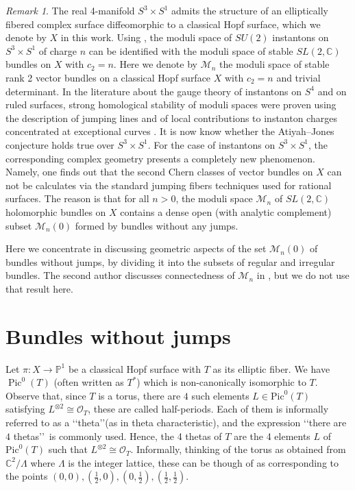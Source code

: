 \documentclass[
  a4paper, 
  reqno, 
  oneside, 
  11pt
]{amsart}
\theoremstyle{plain}	%
\theoremstyle{mydef} %
\theoremstyle{remark}
\newtheorem{remark}{Remark}
\theoremstyle{definition}
\theoremstyle{remark}
\DeclareMathOperator{\Pic}{Pic}
\begin{document}
\begin{remark}
The real 4-manifold $S^3 \times S^1$ admits the structure of an elliptically fibered
 complex surface diffeomorphic to  a classical Hopf surface, 
which we denote by $X$ in this work. 
Using \cite[Thm.]{Bu}, the moduli space of $SU(2)$ instantons on $S^3 \times S^1$
of charge $n$ can be identified with the moduli space of stable $SL(2,\mathbb C)$ bundles on $X$ with $c_2=n$.
 Here we denote by $\mathcal M_n$  the moduli space of  stable rank 2 vector bundles on 
 a classical Hopf surface $X$
 with $c_2=n$ and trivial determinant. 
  In the literature about the gauge theory of instantons on $S^4$ and  on ruled surfaces, 
  strong homological stability 
  of moduli spaces were proven using the description of jumping lines \cite{BHMM, HM}
  and of local contributions to instanton charges concentrated at exceptional curves \cite{Ga}.
It is now know
  whether the Atiyah--Jones conjecture \cite{AJ} holds true over $S^3\times S^1$.
  For the case of instantons on $S^3\times S^1$, the corresponding complex geometry
  presents a  completely new phenomenon.
 Namely, one  finds out that 
  the second Chern classes of vector bundles on $X$ can not be calculates via  the standard
  { jumping fibers} techniques used for rational surfaces. The reason is that 
   for all $n>0$, the moduli space $\mathcal M_n$ 
  of $SL(2,\mathbb C)$  holomorphic bundles 
  on $X$ contains a dense open (with analytic complement) subset $\mathcal M_n(0)$  formed by bundles without any jumps.
  \end{remark}
 
  Here we concentrate in discussing geometric aspects of the 
   set $\mathcal M_n(0)$ of bundles without jumps, by dividing it into the subsets of regular 
   and irregular bundles.  
  The second author discusses connectedness of 
  $\mathcal M_n$ in \cite{Ga2}, but we do not use that result here.

\section{Bundles without jumps}
Let $\pi\colon X\to \mathbb P^1$ be a classical Hopf surface  with $T$ as its elliptic fiber. 
We have $\Pic^0(T)$ (often written as $T^\ast$) which is non-canonically isomorphic to $T$.
Observe that, since $T$ is a torus, there are $4$ such elements $L\in \mathrm{Pic}^0(T) $ 
satisfying $L^{\otimes 2} \cong \mathcal O_T$, these are called half-periods. 
Each of them is informally referred to as a \lq\lq theta\rq\rq (as in theta characteristic), and the expression 
\lq\lq there are $4$ thetas\rq\rq \,  is commonly used. 
Hence, the 4 thetas of $T$ are the 4 elements $L$ of $\mathrm{Pic}^0(T)$  such that $L^{\otimes 2}\cong \mathcal O_T$. 
Informally, thinking of the torus as obtained from $\mathbb C^2/\Lambda$ where $\Lambda$ is the 
integer lattice, these can be though of as 
corresponding to the points  $(0,0), (\frac{1}{2},0), (0, \frac{1}{2}), (\frac{1}{2},\frac{1}{2})$.\\
\end{document}
